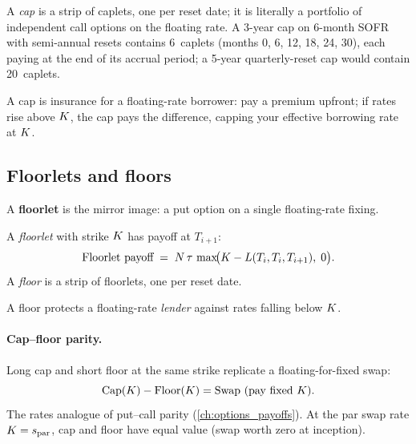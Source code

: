\begin{definition}[Cap]
\label{def:cap}
A \emph{cap} is a strip of caplets, one per reset date; it is
literally a portfolio of independent call options on the floating rate.  A
3-year cap on 6-month SOFR with semi-annual resets contains 6~caplets
(months 0, 6, 12, 18, 24, 30), each paying at the end of its accrual
period; a 5-year quarterly-reset cap would contain 20~caplets.
\end{definition}

\begin{intuitionbox}
A cap is insurance for a floating-rate borrower: pay a premium
upfront; if rates rise above $K$, the cap pays the difference,
capping your effective borrowing rate at $K$.
\end{intuitionbox}

\subsection{Floorlets and floors}

A \textbf{floorlet} is the mirror image: a put option on a single
floating-rate fixing.

\begin{definition}
\label{def:floorlet}
A \emph{floorlet} with strike $K$ has payoff at $T_{i+1}$:
\begin{equation}
  \text{Floorlet payoff} \;=\; N\,\tau\,\max\!\bigl(K - L(T_i, T_i, T_{i+1}),\; 0\bigr).
  \label{eq:floorlet_payoff}
\end{equation}
A \emph{floor} is a strip of floorlets, one per reset date.
\end{definition}

A floor protects a floating-rate \emph{lender} against rates falling
below $K$.

\paragraph{Cap--floor parity.}
Long cap and short floor at the same strike replicate a
floating-for-fixed swap:
\begin{equation}
  \text{Cap}(K) - \text{Floor}(K) = \text{Swap (pay fixed } K\text{)}.
  \label{eq:cap_floor_parity}
\end{equation}
The rates analogue of put--call parity (\cref{ch:options_payoffs}).
At the par swap rate $K = s_{\text{par}}$, cap and floor have
equal value (swap worth zero at inception).

